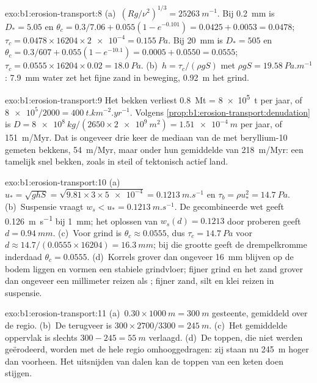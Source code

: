 \begin{solution}{exo:b1:erosion-transport:8}
(a)~$(Rg/\nu^2)^{1/3} = \qty{25263}{m^{-1}}$. Bij \qty{0.2}{mm} is $D_* = 5.05$
en $\theta_c = 0.3/7.06 + 0.055(1 - e^{-0.101}) = 0.0425 + 0.0053 =
0.0478$; $\tau_c = 0.0478 \times 16204 \times \num{2e-4} = \qty{0.155}{Pa}$.
Bij \qty{20}{mm} is $D_* = 505$ en $\theta_c = 0.3/607 + 0.055(1 - e^{-10.1}) =
0.0005 + 0.0550 = 0.0555$; $\tau_c = 0.0555 \times 16204 \times 0.02 =
\qty{18.0}{Pa}$. (b)~$h = \tau_c/(\rho g S)$ met $\rho g S =
\qty{19.58}{Pa.m^{-1}}$: \qty{7.9}{mm} water zet het fijne zand in beweging, \qty{0.92}{m}
het grind.
\end{solution}

\begin{solution}{exo:b1:erosion-transport:9}
Het bekken verliest \qty{0.8}{Mt} = \qty{8e5}{t} per jaar, of $\num{8e5}/2000 =
\qty{400}{t.km^{-2}.yr^{-1}}$. Volgens \cref{prop:b1:erosion-transport:denudation} is
$D = \qty{8e8}{kg}/(2650 \times \qty{2e9}{m^2}) = \qty{1.51e-4}{m}$ per jaar, of
\qty{151}{m/Myr}. Dat is ongeveer drie keer de mediaan van de met beryllium-10 gemeten
bekkens, \qty{54}{m/Myr}, maar onder hun gemiddelde van \qty{218}{m/Myr}: een tamelijk
snel bekken, zoals in steil of tektonisch actief land.
\end{solution}

\begin{solution}{exo:b1:erosion-transport:10}
(a)~$u_* = \sqrt{g h S} = \sqrt{9.81 \times 3 \times \num{5e-4}} =
\qty{0.1213}{m.s^{-1}}$ en $\tau_b = \rho u_*^2 = \qty{14.7}{Pa}$.
(b)~Suspensie vraagt $w_s < u_* = \qty{0.1213}{m.s^{-1}}$. De gecombineerde wet
geeft \qty{0.126}{m.s^{-1}} bij \qty{1}{mm}; het oplossen van
$w_s(d) = 0.1213$ door proberen geeft $d = \qty{0.94}{mm}$. (c)~Voor grind is
$\theta_c \approx 0.0555$, dus $\tau_c = \qty{14.7}{Pa}$ voor $d \approx
14.7/(0.0555 \times 16204) = \qty{16.3}{mm}$; bij die grootte geeft de drempelkromme
inderdaad $\theta_c = 0.0555$. (d)~Korrels grover dan ongeveer \qty{16}{mm} blijven op de
bodem liggen en vormen een stabiele grindvloer; fijner grind en het zand grover dan
ongeveer een millimeter reizen als ; fijner zand, silt en klei reizen in
suspensie.
\end{solution}

\begin{solution}{exo:b1:erosion-transport:11}
(a)~$0.30 \times \qty{1000}{m} = \qty{300}{m}$ gesteente, gemiddeld over de regio.
(b)~De terugveer is $300 \times 2700/3300 = \qty{245}{m}$. (c)~Het gemiddelde oppervlak
is slechts $300 - 245 = \qty{55}{m}$ verlaagd. (d)~De toppen, die niet werden geërodeerd,
worden met de hele regio omhooggedragen: zij staan nu \qty{245}{m} hoger dan voorheen.
Het uitsnijden van dalen kan de toppen van een keten doen stijgen.
\end{solution}

